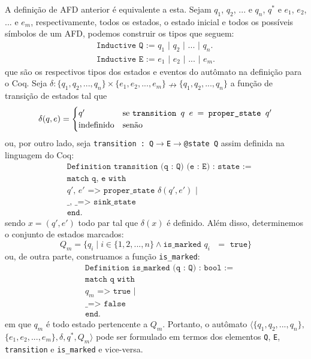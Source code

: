 A definição de AFD anterior é equivalente a esta. Sejam $q_1$, $q_2$, $...$ e $q_n$, $q^*$ e $e_1$, $e_2$, $...$ e $e_m$, respectivamente, todos os estados, o estado inicial e todos os possíveis símbolos de um AFD, podemos construir os tipos que seguem: \begin{gather*}\texttt{Inductive Q := $q_1$ | $q_2$ | $...$ | $q_n$.}\\ \texttt{Inductive E := $e_1$ | $e_2$ | $...$ | $e_m$.}\end{gather*} que são os respectivos tipos dos estados e eventos do autômato na definição para o Coq. Seja $\delta : \{ q_1, q_2, ..., q_n \} \times \{ e_1, e_2, ..., e_m \} \nrightarrow \{ q_1, q_2, ..., q_n \}$ a função de transição de estados tal que $$\delta(q, e) = \begin{cases}
q' & \text{se \texttt{transition $q$ $e$ $=$ proper\_state $q'$}}\\
\text{indefinido} & \text{senão}
\end{cases}$$ ou, por outro lado, seja \texttt{transition : Q$\to$E$\to$@state Q} assim definida na linguagem do Coq: 	\begin{align*}
&\texttt{Definition transition (q : Q) (e : E) : state :=}\\
&\texttt{match q, e with}\\
&\texttt{$q'$, $e'$ => proper\_state $\delta(q', e')$ |}\\
&\texttt{\_, \_ => sink\_state}\\
&\texttt{end.}
\end{align*} sendo $x = (q',e')$ todo par tal que $\delta(x)$ é definido. Além disso, determinemos o conjunto de estados marcados: $$Q_m = \{ q_i \mid i \in \{ 1, 2, ..., n \} \wedge \texttt{is\_marked $q_i$ $=$ true} \}$$ ou, de outra parte, construamos a função \texttt{is\_marked}: \begin{align*}
&\texttt{Definition is\_marked (q : Q) : bool :=}\\
&\texttt{match q with}\\
&\texttt{$q_m$ => true |}\\
&\texttt{\_ => false}\\
&\texttt{end.}
\end{align*} em que $q_m$ é todo estado pertencente a $Q_m$. Portanto, o autômato $\langle \{ q_1, q_2, ..., q_n \},$ $\{ e_1, e_2, ..., e_m \}, \delta, q^*, Q_m \rangle$ pode ser formulado em termos dos elementos \texttt{Q}, \texttt{E}, \texttt{transition} e \texttt{is\_marked} e vice-versa.

